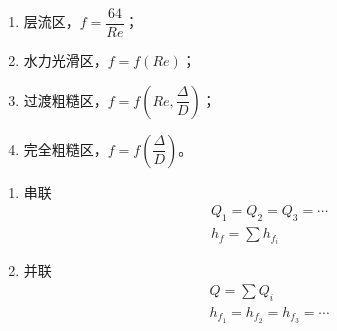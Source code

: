 
\begin{enumerate}
	\item 层流区，$f = \dfrac{64}{Re}$；
	\item 水力光滑区，$f = f(Re)$；
	\item 过渡粗糙区，$f = f(Re, \dfrac{\Delta}{D})$；
	\item 完全粗糙区，$f = f(\dfrac{\Delta}{D})$。
\end{enumerate}


\begin{enumerate}
	\item 串联
	\begin{align*}
		&Q_1 = Q_2 = Q_3 = \cdots\\
		&h_f = \sum h_{f_i}
	\end{align*}
    \item 并联
    \begin{align*}
    	&Q = \sum Q_i\\
    	&h_{f_1} = h_{f_2} = h_{f_3} = \cdots
    \end{align*}
\end{enumerate}


